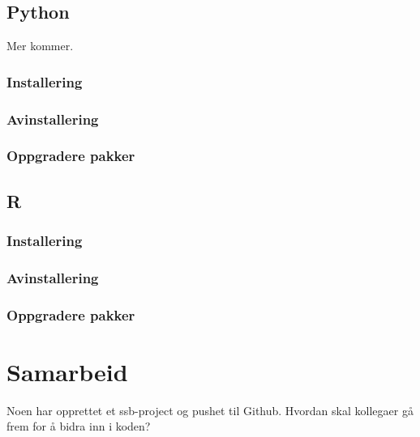 \documentclass[
  letterpaper,
  DIV=11,
  numbers=noendperiod]{scrreprt}
\begin{document}
\hypertarget{python-1}{%
\section{Python}\label{python-1}}

Mer kommer.

\hypertarget{installering}{%
\subsection{Installering}\label{installering}}

\hypertarget{avinstallering}{%
\subsection{Avinstallering}\label{avinstallering}}

\hypertarget{oppgradere-pakker}{%
\subsection{Oppgradere pakker}\label{oppgradere-pakker}}

\hypertarget{r-1}{%
\section{R}\label{r-1}}

\hypertarget{installering-1}{%
\subsection{Installering}\label{installering-1}}

\hypertarget{avinstallering-1}{%
\subsection{Avinstallering}\label{avinstallering-1}}

\hypertarget{oppgradere-pakker-1}{%
\subsection{Oppgradere pakker}\label{oppgradere-pakker-1}}

\hypertarget{samarbeid}{%
\chapter{Samarbeid}\label{samarbeid}}

Noen har opprettet et ssb-project og pushet til Github. Hvordan skal
kollegaer gå frem for å bidra inn i koden?
\end{document}
